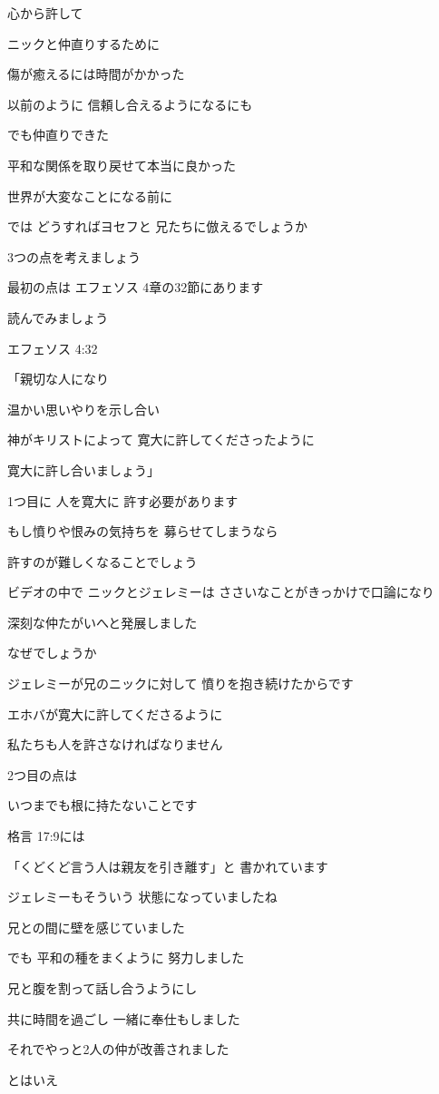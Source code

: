 \documentclass[twocolumn]{jsarticle}
\begin{document}
心から許して

ニックと仲直りするために

傷が癒えるには時間がかかった

以前のように
信頼し合えるようになるにも

でも仲直りできた

平和な関係を取り戻せて本当に良かった

世界が大変なことになる前に

では どうすればヨセフと
兄たちに倣えるでしょうか

3つの点を考えましょう

最初の点は
エフェソス 4章の32節にあります

読んでみましょう

エフェソス 4:32

「親切な人になり

温かい思いやりを示し合い

神がキリストによって
寛大に許してくださったように

寛大に許し合いましょう」

1つ目に 人を寛大に
許す必要があります

もし憤りや恨みの気持ちを
募らせてしまうなら

許すのが難しくなることでしょう

ビデオの中で ニックとジェレミーは
ささいなことがきっかけで口論になり

深刻な仲たがいへと発展しました

なぜでしょうか

ジェレミーが兄のニックに対して
憤りを抱き続けたからです

エホバが寛大に許してくださるように

私たちも人を許さなければなりません

2つ目の点は

いつまでも根に持たないことです

格言 17:9には

「くどくど言う人は親友を引き離す」と
書かれています

ジェレミーもそういう
状態になっていましたね

兄との間に壁を感じていました

でも 平和の種をまくように
努力しました

兄と腹を割って話し合うようにし

共に時間を過ごし
一緒に奉仕もしました

それでやっと2人の仲が改善されました

とはいえ
\end{document}
